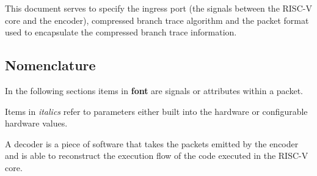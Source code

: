 This document serves to specify the ingress port (the signals between
the RISC-V core and the encoder), compressed branch trace algorithm and
the packet format used to encapsulate the compressed branch trace
information.

\subsection{Nomenclature}

In the following sections items in \textbf{font} are signals or
attributes within a packet.

Items in \textit {italics} refer to parameters either built into the
hardware or configurable hardware values.

A decoder is a piece of software that takes the packets emitted by the
encoder and is able to reconstruct the execution flow of the code
executed in the RISC-V core.
